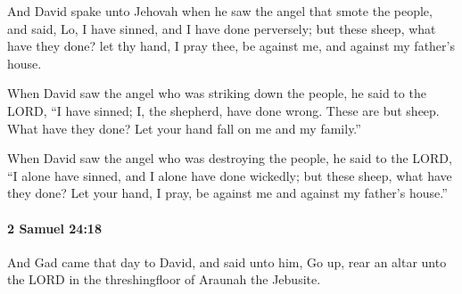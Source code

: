 			\begin{versebox}
					\item[BHS] 
					\item[ASV] And David spake unto Jehovah when he saw the angel that smote the people, and said, Lo, I have sinned, and I have done perversely; but these sheep, what have they done? let thy hand, I pray thee, be against me, and against my father's house.
					\item[NIV] When David saw the angel who was striking down the people, he said to the LORD, “I have sinned; I, the shepherd, have done wrong. These are but sheep. What have they done? Let your hand fall on me and my family.”
					\item[NRSV] When David saw the angel who was destroying the people, he said to the LORD, “I alone have sinned, and I alone have done wickedly; but these sheep, what have they done? Let your hand, I pray, be against me and against my father’s house.”
			\end{versebox}

		\paragraph{2 Samuel 24:18} %
			\label{2SAMUEL-24-18}

			And Gad came that day to David, and said unto him, Go up, rear an altar unto the LORD in the threshingfloor of Araunah the Jebusite.


